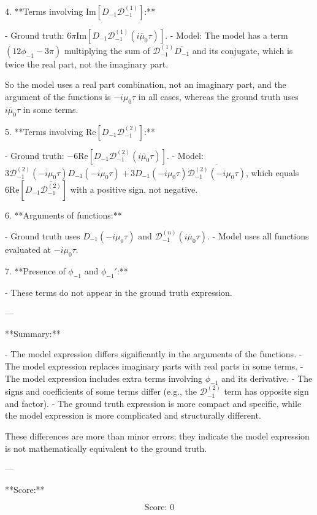 \documentclass[10pt]{article}
\begin{document}
4. **Terms involving \(\mathrm{Im}[D_{-1} \mathcal{D}^{(1)}_{-1}]\):**

- Ground truth: \(6\pi \mathrm{Im}[D_{-1} \mathcal{D}^{(1)}_{-1}(i\overline{\mu}_0 \tau)]\).
- Model: The model has a term \((12 \phi_{-1} - 3\pi)\) multiplying the sum of \(\mathcal{D}^{(1)}_{-1} \overline{D_{-1}}\) and its conjugate, which is twice the real part, not the imaginary part.

So the model uses a real part combination, not an imaginary part, and the argument of the functions is \(-i\mu_0 \tau\) in all cases, whereas the ground truth uses \(i \overline{\mu}_0 \tau\) in some terms.

5. **Terms involving \(\mathrm{Re}[D_{-1} \mathcal{D}^{(2)}_{-1}]\):**

- Ground truth: \(-6 \mathrm{Re}[D_{-1} \mathcal{D}^{(2)}_{-1}(i \overline{\mu}_0 \tau)]\).
- Model: \(3 \mathcal{D}^{(2)}_{-1}(-i\mu_0 \tau) \overline{D_{-1}(-i\mu_0 \tau)} + 3 D_{-1}(-i\mu_0 \tau) \overline{\mathcal{D}^{(2)}_{-1}(-i\mu_0 \tau)}\), which equals \(6 \mathrm{Re}[D_{-1} \overline{\mathcal{D}^{(2)}_{-1}}]\) with a positive sign, not negative.

6. **Arguments of functions:**

- Ground truth uses \(D_{-1}(-i\mu_0 \tau)\) and \(\mathcal{D}^{(n)}_{-1}(i \overline{\mu}_0 \tau)\).
- Model uses all functions evaluated at \(-i\mu_0 \tau\).

7. **Presence of \(\phi_{-1}\) and \(\phi_{-1}'\):**

- These terms do not appear in the ground truth expression.

---

**Summary:**

- The model expression differs significantly in the arguments of the functions.
- The model expression replaces imaginary parts with real parts in some terms.
- The model expression includes extra terms involving \(\phi_{-1}\) and its derivative.
- The signs and coefficients of some terms differ (e.g., the \(\mathcal{D}^{(2)}_{-1}\) term has opposite sign and factor).
- The ground truth expression is more compact and specific, while the model expression is more complicated and structurally different.

These differences are more than minor errors; they indicate the model expression is not mathematically equivalent to the ground truth.

---

**Score:**

\[
\boxed{
\text{Score: } 0
}
\]
\end{document}
